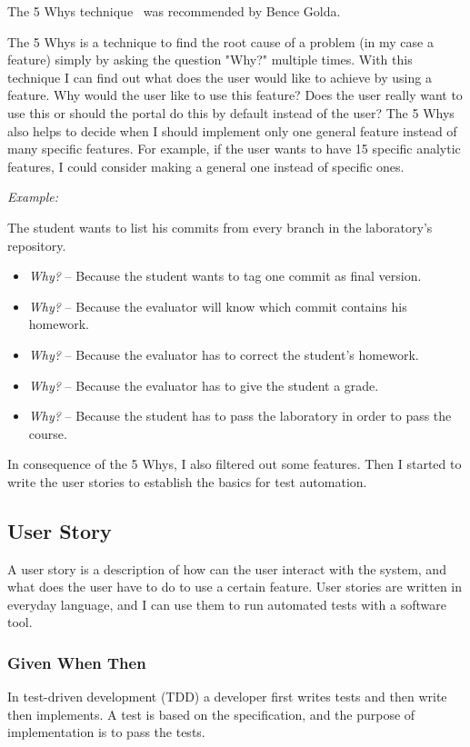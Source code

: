 The 5 Whys technique~\cite{5-why-article} was recommended by Bence Golda. 

The 5 Whys is a technique to find the root cause of a problem (in my case a feature) simply by asking the question "Why?" multiple times. With this technique I can find out what does the user would like to achieve by using a feature. Why would the user like to use this feature? Does the user really want to use this or should the portal do this by default instead of the user? The 5 Whys also helps to decide when I should implement only one general feature instead of many specific features. For example, if the user wants to have 15 specific analytic features, I could consider making a general one instead of specific ones. 

\emph{Example:}

The student wants to list his commits from every branch in the laboratory's repository.
\begin{itemize}
	\item \emph{Why?} -- Because the student wants to tag one commit as final version.
	\item \emph{Why?} -- Because the evaluator will know which commit contains his homework.
	\item \emph{Why?} -- Because the evaluator has to correct the student's homework.
	\item \emph{Why?} -- Because the evaluator has to give the student a grade.
	\item \emph{Why?} -- Because the student has to pass the laboratory in order to pass the course.
\end{itemize}

In consequence of the 5 Whys, I also filtered out some features. Then I started to write the user stories to establish the basics for test automation.

\subsection{User Story}\label{spec-user-story}
A user story is a description of how can the user interact with the system, and what does the user have to do to use a certain feature. User stories are written in everyday language, and I can use them to run automated tests with a software tool. 

\subsubsection{Given When Then}
In test-driven development (TDD) a developer first writes tests and then write then implements. A test is based on the specification, and the purpose of implementation is to pass the tests. 

